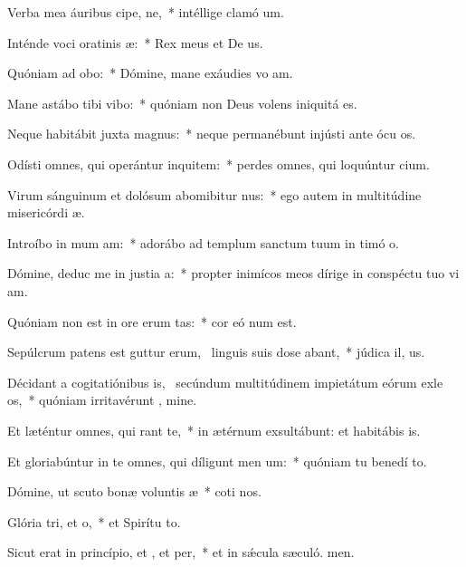 \item Verba mea áuribus cipe, ne,~* intéllige clamó um.
\item Inténde voci oratinis æ:~* Rex meus et De us.
\item Quóniam ad  obo:~* Dómine, mane exáudies vo am.
\item Mane astábo tibi  vibo:~* quóniam non Deus volens iniquitá  es.
\item Neque habitábit juxta  magnus:~* neque permanébunt injústi ante ócu os.
\item Odísti omnes, qui operántur inquitem:~* perdes omnes, qui loquúntur cium.
\item Virum sánguinum et dolósum abomibitur nus:~* ego autem in multitúdine misericórdi æ.
\item Introíbo in mum am:~* adorábo ad templum sanctum tuum in timó o.
\item Dómine, deduc me in justia a:~* propter inimícos meos dírige in conspéctu tuo vi am.
\item Quóniam non est in ore erum tas:~* cor eó num est.
\item Sepúlcrum patens est guttur erum,~\pscross{} linguis suis dose abant,~* júdica il, us.
\item Décidant a cogitatiónibus is,~\pscross{} secúndum multitúdinem impietátum eórum exle os,~* quóniam irritavérunt , mine.
\item Et læténtur omnes, qui rant  te,~* in ætérnum exsultábunt: et habitábis  is.
\item Et gloriabúntur in te omnes, qui díligunt men um:~* quóniam tu benedí to.
\item Dómine, ut scuto bonæ voluntis æ~* coti nos.
\item Glória tri, et o,~* et Spirítu to.
\item Sicut erat in princípio, et , et per,~* et in sǽcula sæculó. men.
